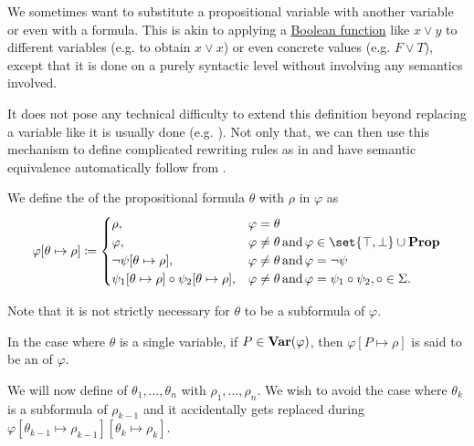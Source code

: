 \begin{definition}\label{def:propositional_substitution}
  We sometimes want to substitute a propositional variable with another variable or even with a formula. This is akin to applying a \hyperref[def:boolean_function]{Boolean function} like \( x \vee y \) to different variables (e.g. to obtain \( x \vee x \)) or even concrete values (e.g. \( F \vee T \)), except that it is done on a purely syntactic level without involving any semantics involved.

  It does not pose any technical difficulty to extend this definition beyond replacing a variable like it is usually done (e.g. \cite[def. 7.8]{OpenLogicFull}). Not only that, we can then use this mechanism to define complicated rewriting rules as in  and have semantic equivalence automatically follow from .

  \begin{thmenum}
     We define the  of the propositional formula \( \theta \) with \( \rho \) in \( \varphi \) as
    \begin{equation}\label{eq:def:propositional_substitution/single}
      \varphi[\theta \mapsto \rho] \coloneqq \begin{cases}
        \rho,                                                             &\varphi = \theta \\
        \varphi,                                                          &\varphi \neq \theta \T{and} \varphi \in \set{ \top, \bot } \cup \boldop{Prop} \\
        \neg \psi[\theta \mapsto \rho],                                   &\varphi \neq \theta \T{and} \varphi = \neg \psi \\
        \psi_1[\theta \mapsto \rho] \bincirc \psi_2[\theta \mapsto \rho], &\varphi \neq \theta \T{and} \varphi = \psi_1 \bincirc \psi_2, \circ \in \Sigma.
      \end{cases}
    \end{equation}

    Note that it is not strictly necessary for \( \theta \) to be a subformula of \( \varphi \).

    In the case where \( \theta \) is a single variable, if \( P \in \operatorname{\mathbf{Var}}(\varphi) \), then \( \varphi[P \mapsto \rho] \) is said to be an  of \( \varphi \).

     We will now define  of \( \theta_1, \ldots, \theta_n \) with \( \rho_1, \ldots, \rho_n \). We wish to avoid the case where \( \theta_k \) is a subformula of \( \rho_{k-1} \) and it accidentally gets replaced during \( \varphi[\theta_{k-1} \mapsto \rho_{k-1}][\theta_k \mapsto \rho_k] \).


\end{thmenum}
\end{definition}
